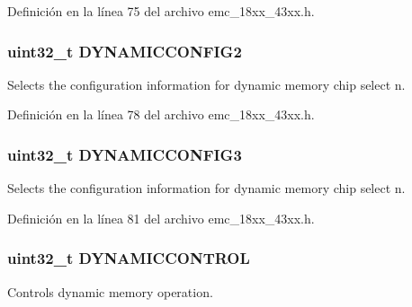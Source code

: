 Definición en la línea 75 del archivo emc\+\_\+18xx\+\_\+43xx.\+h.

\subsubsection[{\texorpdfstring{D\+Y\+N\+A\+M\+I\+C\+C\+O\+N\+F\+I\+G2}{DYNAMICCONFIG2}}]{ uint32\+\_\+t D\+Y\+N\+A\+M\+I\+C\+C\+O\+N\+F\+I\+G2}\hypertarget{struct_l_p_c___e_m_c___t_a7471aad96d64630f05c93f33ad669f7f}{}\label{struct_l_p_c___e_m_c___t_a7471aad96d64630f05c93f33ad669f7f}
Selects the configuration information for dynamic memory chip select n. 

Definición en la línea 78 del archivo emc\+\_\+18xx\+\_\+43xx.\+h.

\subsubsection[{\texorpdfstring{D\+Y\+N\+A\+M\+I\+C\+C\+O\+N\+F\+I\+G3}{DYNAMICCONFIG3}}]{ uint32\+\_\+t D\+Y\+N\+A\+M\+I\+C\+C\+O\+N\+F\+I\+G3}\hypertarget{struct_l_p_c___e_m_c___t_a9a25f77c73d0434e88fe8f1ec94c144f}{}\label{struct_l_p_c___e_m_c___t_a9a25f77c73d0434e88fe8f1ec94c144f}
Selects the configuration information for dynamic memory chip select n. 

Definición en la línea 81 del archivo emc\+\_\+18xx\+\_\+43xx.\+h.

\subsubsection[{\texorpdfstring{D\+Y\+N\+A\+M\+I\+C\+C\+O\+N\+T\+R\+OL}{DYNAMICCONTROL}}]{ uint32\+\_\+t D\+Y\+N\+A\+M\+I\+C\+C\+O\+N\+T\+R\+OL}\hypertarget{struct_l_p_c___e_m_c___t_a051fd0c2c74de7fe0777963b604796f5}{}\label{struct_l_p_c___e_m_c___t_a051fd0c2c74de7fe0777963b604796f5}
Controls dynamic memory operation. 

